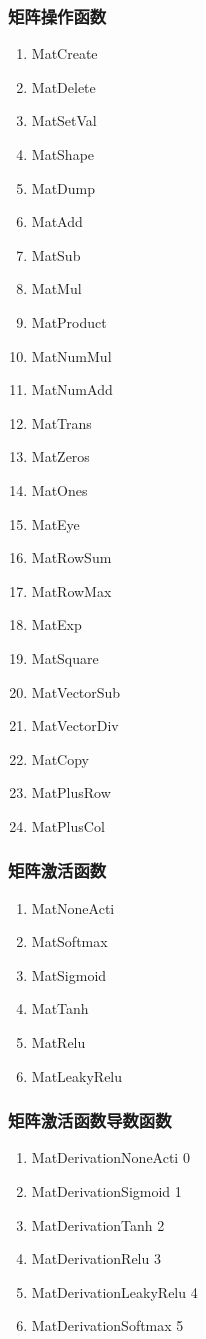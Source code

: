 \subsubsection{矩阵操作函数}
\begin{enumerate}
  \item MatCreate
  \item MatDelete
  \item MatSetVal
  \item MatShape
  \item MatDump
  \item MatAdd
  \item MatSub
  \item MatMul
  \item MatProduct
  \item MatNumMul
  \item MatNumAdd
  \item MatTrans
  \item MatZeros
  \item MatOnes
  \item MatEye
  \item MatRowSum
  \item MatRowMax
  \item MatExp
  \item MatSquare
  \item MatVectorSub
  \item MatVectorDiv
  \item MatCopy
  \item MatPlusRow
  \item MatPlusCol
\end{enumerate}



\subsubsection{矩阵激活函数}

\begin{enumerate}
  \item MatNoneActi
  \item MatSoftmax
  \item MatSigmoid
  \item MatTanh
  \item MatRelu
  \item MatLeakyRelu
\end{enumerate}

\subsubsection{矩阵激活函数导数函数}
\begin{enumerate}
  \item MatDerivationNoneActi   0
  \item MatDerivationSigmoid   1
  \item MatDerivationTanh   2
  \item MatDerivationRelu   3
  \item MatDerivationLeakyRelu   4
  \item MatDerivationSoftmax   5
\end{enumerate}

